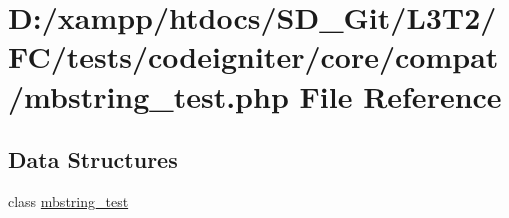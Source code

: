 \hypertarget{mbstring__test_8php}{}\section{D\+:/xampp/htdocs/\+S\+D\+\_\+\+Git/\+L3\+T2/\+F\+C/tests/codeigniter/core/compat/mbstring\+\_\+test.php File Reference}
\label{mbstring__test_8php}
\subsection*{Data Structures}
\begin{DoxyCompactItemize}
\item 
class \hyperlink{classmbstring__test}{mbstring\+\_\+test}
\end{DoxyCompactItemize}
